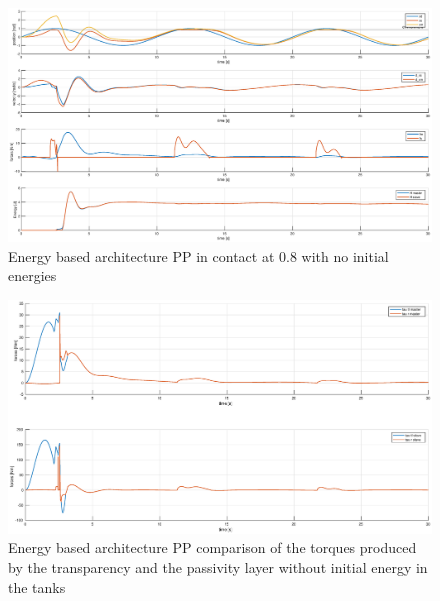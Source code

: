 \documentclass[a4paper,12pt]{article}
\begin{document}
\begin{figure}[H]
    \begin{center}
        \hspace*{-4.5cm}
        \includegraphics[scale=0.5]{images/energy_pp_no_energy.eps}
    \end{center}
    \caption{Energy based architecture PP in contact at 0.8 with no initial energies}
    \label{fig:energy_pp_no_energy}
\end{figure}

\begin{figure}[H]
    \begin{center}
        \hspace*{-4.5cm}
        \includegraphics[scale=0.5]{images/energy_pp_tau.eps}
    \end{center}
    \caption{Energy based architecture PP comparison of the torques produced by the transparency and the passivity layer without initial energy in the tanks}
    \label{fig:energy_pp_tau}
\end{figure}
\end{document}
